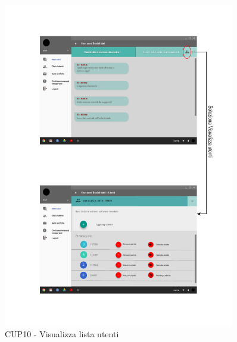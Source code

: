 \begin{figure}
	\centering
	\includegraphics[width=0.9\textwidth]{imgs/gruppo6/activities/act_cup10_visualizza_lista_utenti.pdf}
	\caption{CUP10 - Visualizza lista utenti}
	\label{fig:act-cup10}
\end{figure}

